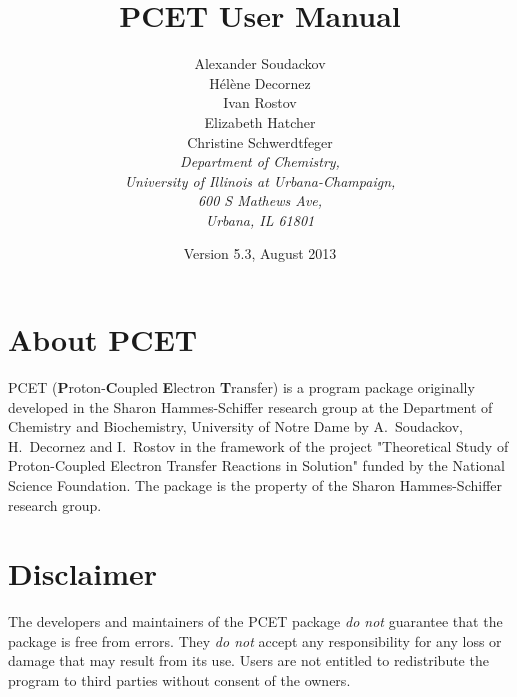 \documentclass[oneside,11pt,openany]{book}
\begin{document}
%
\title{PCET User Manual}
%
\author{Alexander Soudackov\\
H\'el\`ene Decornez\\
Ivan Rostov\\
Elizabeth Hatcher\\
Christine Schwerdtfeger\\
%
\it{\small Department of Chemistry,}\\
\it{\small University of Illinois at Urbana-Champaign,}\\
\it{\small 600 S Mathews Ave,}\\
\it{\small Urbana, IL 61801}}
%
\date{Version 5.3, August 2013}

\maketitle
\frontmatter
\chapter*{About PCET}
PCET ({\bf P}roton-{\bf C}oupled {\bf E}lectron {\bf T}ransfer)
is a program package originally developed in the Sharon Hammes-Schiffer
research group at the Department of Chemistry and Biochemistry,
University of Notre Dame by A.~Soudackov, H.~Decornez and I.~Rostov in
the framework of the project "Theoretical Study of Proton-Coupled
Electron Transfer Reactions in Solution" funded by the National Science
Foundation. The package is the property of the Sharon Hammes-Schiffer
research group.

\chapter*{Disclaimer}
The developers and maintainers of the PCET package {\em do not}
guarantee that the package is free from errors. They {\em do not}
accept any responsibility for any loss or damage that may result
from its use. Users are not entitled to redistribute the program
to third parties without consent of the owners.

\tableofcontents

\mainmatter

\end{document}
